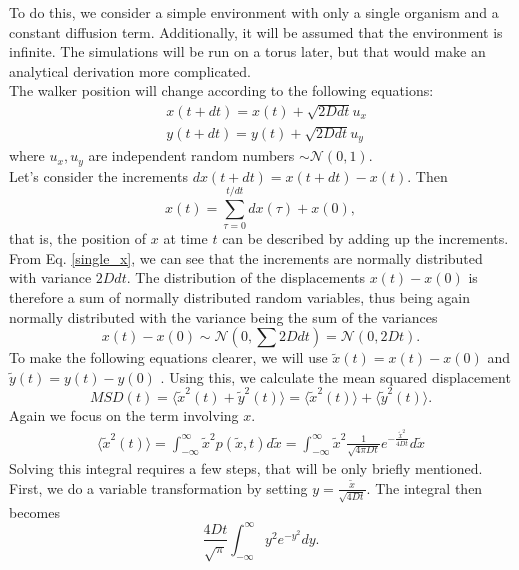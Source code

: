 \documentclass{article}
\begin{document}
To do this, we consider a simple environment with only a single organism and a constant diffusion term. 
Additionally, it will be assumed that the environment is infinite. 
The simulations will be run on a torus later, but that would make an analytical derivation more complicated.\\
The walker position will change according to the following equations:
\begin{align}
    & x(t + dt) = x(t) + \sqrt{2D dt} u_x \label{single_x}\\
    & y(t + dt) = y(t) + \sqrt{2D dt} u_y
\end{align}
where $u_x, u_y$ are independent random numbers $\sim \mathcal{N}(0,1)$.\\
Let's consider the increments $dx(t+dt) = x(t + dt) - x(t)$.
Then 
\begin{equation*}
    x(t) = \sum_{\tau = 0}^{t/dt} dx(\tau) + x(0),
\end{equation*}
that is, the position of $x$ at time $t$ can be described by adding up the increments.
From Eq. \ref{single_x}, we can see that the increments are normally distributed with variance $2D dt$.
The distribution of the displacements $x(t) - x(0)$ is therefore a sum of normally distributed random variables, thus being again normally distributed with the variance being the sum of the variances 
\begin{equation*}
    x(t) - x(0) \sim \mathcal{N}(0,\sum 2D dt) =  \mathcal{N}(0,2Dt).
\end{equation*}
To make the following equations clearer, we will use $\tilde{x}(t) = x(t)-x(0)$ and $\tilde{y}(t) = y(t)-y(0)$ .
Using this, we calculate the mean squared displacement 
\begin{equation*}
    MSD(t) = \langle \tilde{x}^2(t) +\tilde{y}^2(t) \rangle = \langle \tilde{x}^2(t)\rangle + \langle\tilde{y}^2(t) \rangle.
\end{equation*}
Again we focus on the term involving $x$.
\begin{align*}
    \langle \tilde{x}^2(t)\rangle = \int_{-\infty}^{\infty} \tilde{x}^2 p(\tilde{x},t)d\tilde{x} = \int_{-\infty}^{\infty} \tilde{x}^2 \frac{1}{\sqrt{4\pi Dt}} e^{-\frac{\tilde{x}^2}{4Dt}}d\tilde{x}
\end{align*}
Solving this integral requires a few steps, that will be only briefly mentioned. 
First, we do a variable transformation by setting $y = \frac{\tilde{x}}{\sqrt{4Dt}}$. 
The integral then becomes
\begin{equation*}
    \frac{4Dt}{\sqrt{\pi}}\int_{-\infty}^{\infty} y^2  e^{-y^2}dy.
\end{equation*}
\end{document}
